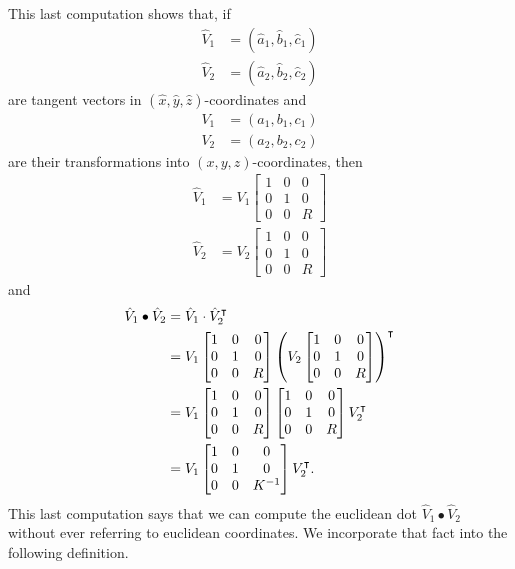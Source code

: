 \documentclass{ximera}
\begin{document}
This last computation shows that, if
\begin{align*}
\hat{V}_{1}  &  =\left(  \hat{a}_{1},\hat{b}_{1},\hat{c}_{1}\right) \\
\hat{V}_{2}  &  =\left(  \hat{a}_{2},\hat{b}_{2},\hat{c}_{2}\right)
\end{align*}
are tangent vectors in $\left(  \hat{x},\hat{y},\hat{z}\right)  $-coordinates
and%
\begin{align*}
V_{1}  &  =\left(  a_{1},b_{1},c_{1}\right) \\
V_{2}  &  =\left(  a_{2},b_{2},c_{2}\right)
\end{align*}
are their transformations into $\left(  x,y,z\right)  $-coordinates, then%
\begin{align*}
\hat{V}_{1}  &  =V_{1}
\begin{bmatrix}
1 & 0 & 0\\
0 & 1 & 0\\
0 & 0 & R
\end{bmatrix}
 \\
\hat{V}_{2}  &  =V_{2} 
\begin{bmatrix}
1 & 0 & 0\\
0 & 1 & 0\\
0 & 0 & R
\end{bmatrix}
\end{align*}
and%
\begin{align*}
\hat{V}_{1}\bullet\hat{V}_{2} &= \hat{V}_{1}\cdot \hat{V}_{2}^\transpose\\
&=V_{1}
\begin{bmatrix}
1 & 0 & 0\\
0 & 1 & 0\\
0 & 0 & R
\end{bmatrix}
\left(V_{2}
\begin{bmatrix}
1 & 0 & 0\\
0 & 1 & 0\\
0 & 0 & R
\end{bmatrix}\right)^\transpose\\
&=V_{1}
\begin{bmatrix}
1 & 0 & 0\\
0 & 1 & 0\\
0 & 0 & R
\end{bmatrix}
\begin{bmatrix}
1 & 0 & 0\\
0 & 1 & 0\\
0 & 0 & R
\end{bmatrix}
V_{2}^\transpose\\
&=V_{1}
\begin{bmatrix}
1 & 0 & 0\\
0 & 1 & 0\\
0 & 0 & K^{-1}%
\end{bmatrix}
V_{2}^\transpose.
\end{align*}
This last computation says that we can compute the euclidean dot $\hat{V}%
_{1}\bullet\hat{V}_{2}$ without ever referring to euclidean coordinates. We
incorporate that fact into the following definition.
\end{document}
